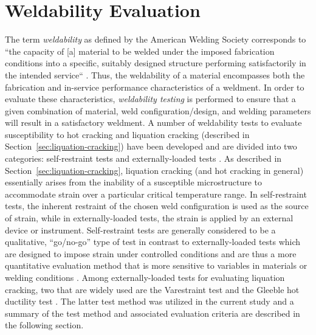


\section{Weldability Evaluation} \label{sec:weldability-evaluation}

The term \emph{weldability} as defined by the American Welding Society corresponds to “the capacity of [a] material to be welded under the imposed fabrication conditions into a specific, suitably designed structure performing satisfactorily in the intended service“ \cite{aws_terms_2010}. Thus, the weldability of a material encompasses both the fabrication and in-service performance characteristics of a weldment. In order to evaluate these characteristics, \emph{weldability testing} is performed to ensure that a given combination of material, weld configuration/design, and welding parameters will result in a satisfactory weldment. A number of weldability tests to evaluate susceptibility to hot cracking and liquation cracking (described in Section~\ref{sec:liquation-cracking}) have been developed and are divided into two categories: self-restraint tests and externally-loaded tests \cite{farrar_hot_2005}. As described in Section~\ref{sec:liquation-cracking}, liquation cracking (and hot cracking in general) essentially arises from the inability of a susceptible microstructure to accommodate strain over a particular critical temperature range. In self-restraint tests, the inherent restraint of the chosen weld configuration is used as the source of strain, while in externally-loaded tests, the strain is applied by an external device or instrument. Self-restraint tests are generally considered to be a qualitative, “go/no-go” type of test in contrast to externally-loaded tests which are designed to impose strain under controlled conditions and are thus a more quantitative evaluation method that is more sensitive to variables in materials or welding conditions \cite{farrar_hot_2005}. Among externally-loaded tests for evaluating liquation cracking, two that are widely used are the Varestraint test \cite{lundin_varestraint_1965} and the Gleeble\texttrademark{} hot ductility test \cite{nippes_investigation_1955}. The latter test method was utilized in the current study and a summary of the test method and associated evaluation criteria are described in the following section.

